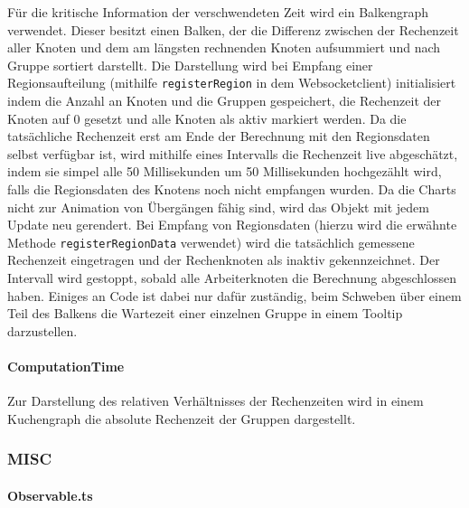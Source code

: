 Für die kritische Information der verschwendeten Zeit wird ein Balkengraph verwendet.
Dieser besitzt einen Balken, der die Differenz zwischen der Rechenzeit aller Knoten und dem am längsten rechnenden Knoten
aufsummiert und nach Gruppe sortiert darstellt.
Die Darstellung wird bei Empfang einer Regionsaufteilung (mithilfe \verb|registerRegion| in dem Websocketclient)
initialisiert indem die Anzahl an Knoten und die Gruppen gespeichert, die Rechenzeit der Knoten auf 0 gesetzt und 
alle Knoten als aktiv markiert werden.
Da die tatsächliche Rechenzeit erst am Ende der Berechnung mit den Regionsdaten selbst verfügbar ist,
wird mithilfe eines Intervalls die Rechenzeit live abgeschätzt, indem sie simpel alle 50 Millisekunden
um 50 Millisekunden hochgezählt wird, falls die Regionsdaten des Knotens noch nicht empfangen wurden.
Da die Charts nicht zur Animation von Übergängen fähig sind, wird das Objekt mit jedem Update neu gerendert.
Bei Empfang von Regionsdaten (hierzu wird die erwähnte Methode \verb|registerRegionData| verwendet) 
wird die tatsächlich gemessene Rechenzeit eingetragen und der Rechenknoten als inaktiv gekennzeichnet.
Der Intervall wird gestoppt, sobald alle Arbeiterknoten die Berechnung abgeschlossen haben.
Einiges an Code ist dabei nur dafür zuständig, beim Schweben über einem Teil des Balkens die Wartezeit
einer einzelnen Gruppe in einem Tooltip darzustellen.

\paragraph{ComputationTime}

Zur Darstellung des relativen Verhältnisses der Rechenzeiten wird in einem Kuchengraph
die absolute Rechenzeit der Gruppen dargestellt.

\subsubsection{MISC} %

\paragraph{Observable.ts}\label{par:observables}